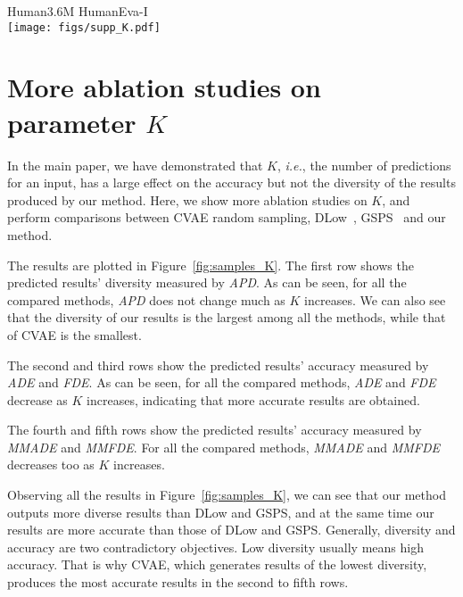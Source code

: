 \documentclass[sigconf,screen,nonacm]{acmart}
\begin{document}
	
	\begin{figure*}[!t]
		\flushleft \hspace{5.7cm} Human3.6M \hspace{4.4cm} HumanEva-I \\
		\centering
		\texttt{[image: figs/supp\_K.pdf]} \\
		\caption{The first row shows how APD of different methods (including CVAE, DLow, GSPS, and our method) varies as $K$ increases. The other rows show the trends of ADE, FDE, MMADE, MMFDE, respectively. The figures on the left are plotted based on the data computed on Human3.6M, while those on the right are plotted based on HumanEva-I.}
		\label{fig:samples_K}
	\end{figure*}
	
	\section{More ablation studies on parameter $K$}
	
	In the main paper, we have demonstrated that $K$, \textit{i.e.}, the number of predictions for an input, has a large effect on the accuracy but not the diversity of the results produced by our method. Here, we show more ablation studies on $K$, and perform comparisons between CVAE random sampling, DLow~\cite{yuan2020dlow}, GSPS~\cite{mao2021generating} and our method.
	
	The results are plotted in Figure~\ref{fig:samples_K}. The first row shows the predicted results' diversity measured by \textit{APD}. As can be seen, for all the compared methods, \textit{APD} does not change much as $K$ increases. We can also see that the diversity of our results is the largest among all the methods, while that of CVAE is the smallest.
	
	The second and third rows show the predicted results' accuracy measured by \textit{ADE} and \textit{FDE}. As can be seen, for all the compared methods, \textit{ADE} and \textit{FDE} decrease as $K$ increases, indicating that more accurate results are obtained. 
	
	The fourth and fifth rows show the predicted results' accuracy measured by \textit{MMADE} and \textit{MMFDE}. For all the compared methods, \textit{MMADE} and \textit{MMFDE} decreases too as $K$ increases. 
	
	Observing all the results in Figure~\ref{fig:samples_K}, we can see that our method outputs more diverse results than DLow and GSPS, and at the same time our results are more accurate than those of DLow and GSPS. Generally, diversity and accuracy are two contradictory objectives. Low diversity usually means high accuracy. That is why CVAE, which generates results of the lowest diversity, produces the most accurate results in the second to fifth rows.
	
\end{document}

